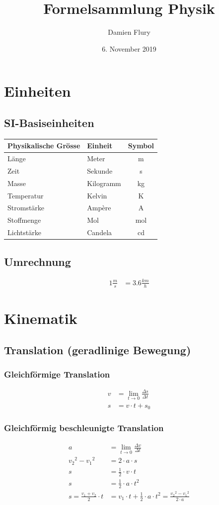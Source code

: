 \documentclass[a4paper]{article}
\title{Formelsammlung Physik}
\date{6. November 2019}
\author{Damien Flury}
\begin{document}
  \maketitle
  \section{Einheiten}
  \subsection{SI-Basiseinheiten}
    \begin{tabular}{|l|l|c|}
      \hline
      \textbf{Physikalische Grösse} & \textbf{Einheit} & \textbf{Symbol} \\ \hline \hline
      Länge & Meter & m \\
      Zeit & Sekunde & s \\
      Masse & Kilogramm & kg \\
      Temperatur & Kelvin & K \\
      Stromstärke & Ampère & A \\
      Stoffmenge & Mol & mol \\
      Lichtstärke & Candela & cd \\
      \hline
    \end{tabular}
  \subsection{Umrechnung}
  \begin{align}
    1 \frac{m}{s} &= 3.6 \frac{km}{h}
  \end{align}
  \section{Kinematik}
  \subsection{Translation (geradlinige Bewegung)}
  \subsubsection{Gleichförmige Translation}
  \begin{align}
    v &= \lim_{t \to 0} \frac{\Delta{}s}{\Delta{}t} \\
    s &= v \cdot t + s_0
  \end{align}
  \subsubsection{Gleichförmig beschleunigte Translation}
  \begin{align}
    a &= \lim_{t \to 0} \frac{\Delta{}v}{\Delta{}t} \\
    v_2{}^2 - v_1{}^2 &= 2 \cdot a \cdot s \\
    s &= \frac{1}{2} \cdot v \cdot t \\
    s &= \frac{1}{2} \cdot a \cdot t^2 \\
    s = \frac{v_1 + v_2}{2} \cdot t &= v_1 \cdot t + \frac{1}{2} \cdot a \cdot t^2 = \frac{v_2{}^{2} - v_1{}^2}{2 \cdot a}
  \end{align}
\end{document}
